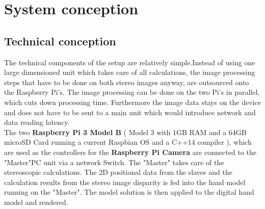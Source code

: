 \chapter{System conception}\section{Technical conception}
The technical components of the setup are relatively simple.Instead of using one large dimensioned unit which takes care of all calculations, the image processing steps that have to be done on both stereo images anyway, are outsourced onto the Raspberry Pi's.
The image processing can be done on the two Pi's in parallel, which cuts down processing time. Furthermore the image data stays on the device and does not have to be sent to a main unit which would introduce network and data reading latency.\\
The two \textbf{Raspberry Pi 3 Model B} ( Model 3 with 1GB RAM and a 64GB microSD Card running a current Raspbian OS and a C++14 compiler ), which are used as the controllers for the \textbf{Raspberry Pi Camera} are connected to the "Master"PC unit via a network Switch. The "Master" takes care of the stereoscopic calculations. The 2D positional data from the slaves and the calculation results from the stereo image disparity is fed into the hand model running on the "Master". The model solution is then applied to the digital hand model and rendered.
